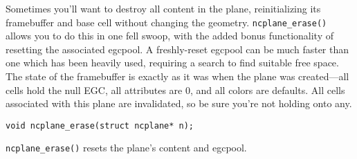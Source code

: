 Sometimes you'll want to destroy all content in the plane, reinitializing
its framebuffer and base cell without changing the geometry. \texttt{ncplane\_erase()}
allows you to do this in one fell swoop, with the added bonus functionality
of resetting the associated egcpool. A freshly-reset egcpool can be much faster
than one which has been heavily used, requiring a search to find suitable free
space. The state of the framebuffer is exactly as it was when the plane was
created---all cells hold the null EGC, all attributes are 0, and all colors
are defaults. All cells associated with this plane are invalidated, so be
sure you're not holding onto any.
\begin{listing}[!htbp]
\begin{verbatim}
void ncplane_erase(struct ncplane* n);
\end{verbatim}
\caption{\texttt{ncplane\_erase()} resets the plane's content and egcpool.}
\end{listing}

